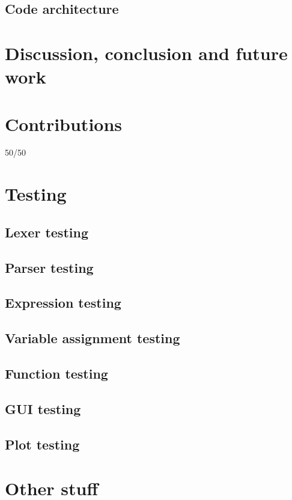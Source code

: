 \documentclass[a4paper, oneside, 11pt]{report}
\begin{document}
\section{Code architecture}\label{sec:code-architecture}

\chapter{Discussion, conclusion and future work}\label{ch:discussion-conclusion-and-future-work}





\appendix
\chapter{Contributions}\label{ch:contributions}

50/50

\chapter{Testing}\label{ch:test}

\section{Lexer testing}\label{sec:lexer-testing}

\section{Parser testing}\label{sec:parser-testing}

\section{Expression testing}\label{sec:arithmetic-expression-testing}

\section{Variable assignment testing}\label{sec:variable-assignment-testing}

\section{Function testing}\label{sec:function-testing}

\section{GUI testing}\label{sec:gui-testing}

\section{Plot testing}\label{sec:plot-testing}

\chapter{Other stuff}\label{ch:other-stuff}
\end{document}
